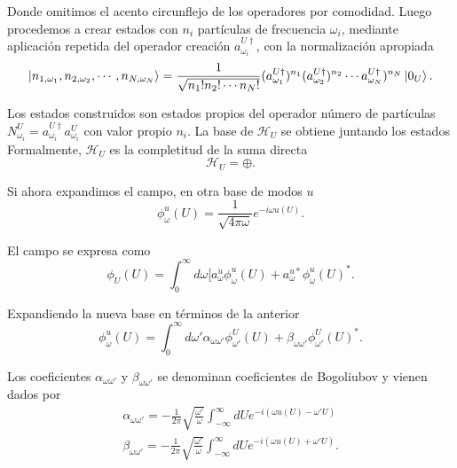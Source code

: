 Donde omitimos el acento circunflejo de los operadores por comodidad.
Luego procedemos a crear estados con $n_i$ partículas de frecuencia $\omega_i$, mediante
aplicación repetida del operador creación $a_{\omega_i}^{U\dagger}$, con la normalización apropiada
\begin{equation}
  \ket{n_{1,\omega_1}, n_{2,\omega_2},\cdots,n_{N,\omega_N}} = \frac{1}{\sqrt{n_1!n_2!\cdots n_N!}}(a_{\omega_1}^{U\dagger})^{n_1}
  (a_{\omega_2}^{U\dagger})^{n_2}\cdots a_{\omega_N}^{U\dagger})^{n_N} \ket{0_U}.
\end{equation}

Los estados construidos son estados propios del operador número de partículas $N_{\omega_i}^U=a_{\omega_i}^{U\dagger}a_{\omega_i}^U$
con valor propio $n_i$.
La base de $\mathcal H_U$ se obtiene juntando los estados 
Formalmente, $\mathcal H_U$ es la completitud de la suma directa 
\begin{equation}
  \mathcal H_U = \oplus  .
\end{equation}

Si ahora expandimos el campo, en otra base de modos $u$
\begin{equation}
  \phi_\omega^u(U)=\frac{1}{\sqrt{4\pi\omega}}e^{-i\omega u(U)}.
\end{equation}

El campo se expresa como
\begin{equation}
  \phi_U(U) = \int_0^\infty d\omega [a_\omega^u \phi^u_\omega(U) +  a_\omega^{u*} \phi_\omega^u(U)^*.
\end{equation}

Expandiendo la nueva base en términos de la anterior
\begin{equation}
  \phi_\omega^u(U) = \int_0^\infty d\omega' \alpha_{\omega\omega'} \phi_{\omega'}^U(U) 
  +\beta_{\omega\omega'} \phi_{\omega'}^U(U)^*.
\end{equation}

Los coeficientes $\alpha_{\omega\omega'}$ y $\beta_{\omega\omega'}$ se denominan coeficientes
de Bogoliubov y vienen dados por
\begin{gather}
  \alpha_{\omega\omega'} = -\frac{1}{2\pi}\sqrt{\frac{\omega'}{\omega}}\int_{-\infty}^\infty dU e^{-i(\omega u(U) -\omega' U)}\\
  \beta_{\omega\omega'} = -\frac{1}{2\pi}\sqrt{\frac{\omega'}{\omega}}\int_{-\infty}^\infty dU e^{-i(\omega u(U) +\omega' U)}.
\end{gather}

